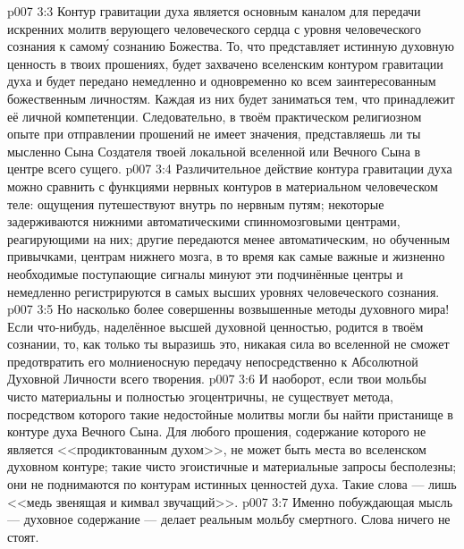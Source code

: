 \vs p007 3:3 \pc Контур гравитации духа является основным каналом для передачи искренних молитв верующего человеческого сердца с уровня человеческого сознания к самом\'у сознанию Божества. То, что представляет истинную духовную ценность в твоих прошениях, будет захвачено вселенским контуром гравитации духа и будет передано немедленно и одновременно ко всем заинтересованным божественным личностям. Каждая из них будет заниматься тем, что принадлежит её личной компетенции. Следовательно, в твоём практическом религиозном опыте при отправлении прошений не имеет значения, представляешь ли ты мысленно Сына Создателя твоей локальной вселенной или Вечного Сына в центре всего сущего.
\vs p007 3:4 \pc Различительное действие контура гравитации духа можно сравнить с функциями нервных контуров в материальном человеческом теле: ощущения путешествуют внутрь по нервным путям; некоторые задерживаются нижними автоматическими спинномозговыми центрами, реагирующими на них; другие передаются менее автоматическим, но обученным привычками, центрам нижнего мозга, в то время как самые важные и жизненно необходимые поступающие сигналы минуют эти подчинённые центры и немедленно регистрируются в самых высших уровнях человеческого сознания.
\vs p007 3:5 Но насколько более совершенны возвышенные методы духовного мира! Если что\hyp{}нибудь, наделённое высшей духовной ценностью, родится в твоём сознании, то, как только ты выразишь это, никакая сила во вселенной не сможет предотвратить его молниеносную передачу непосредственно к Абсолютной Духовной Личности всего творения.
\vs p007 3:6 И наоборот, если твои мольбы чисто материальны и полностью эгоцентричны, не существует метода, посредством которого такие недостойные молитвы могли бы найти пристанище в контуре духа Вечного Сына. Для любого прошения, содержание которого не является <<продиктованным духом>>, не может быть места во вселенском духовном контуре; такие чисто эгоистичные и материальные запросы бесполезны; они не поднимаются по контурам истинных ценностей духа. Такие слова --- лишь <<медь звенящая и кимвал звучащий>>.
\vs p007 3:7 Именно побуждающая мысль --- духовное содержание --- делает реальным мольбу смертного. Слова ничего не стоят.
